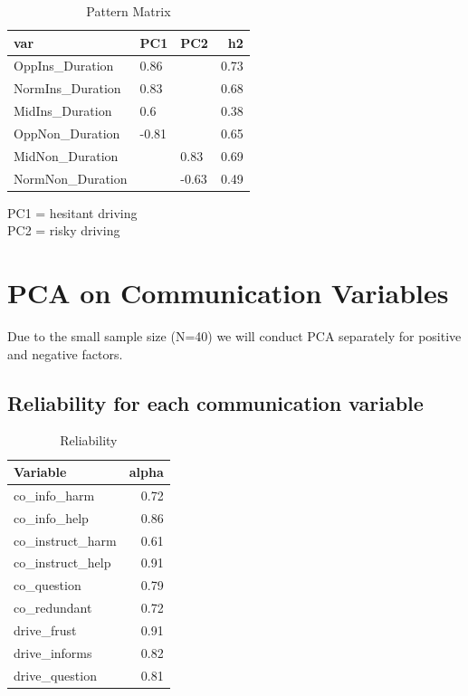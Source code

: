 \documentclass[]{article}
\begin{document}
\begin{table}[H]

\caption{\label{tab:unnamed-chunk-6}Pattern Matrix}
\centering
\fontsize{6}{8}\selectfont
\begin{tabular}[t]{lllr}
\toprule
var & PC1 & PC2 & h2\\
\midrule
OppIns\_Duration & 0.86 &  & 0.73\\
NormIns\_Duration & 0.83 &  & 0.68\\
MidIns\_Duration & 0.6 &  & 0.38\\
OppNon\_Duration & -0.81 &  & 0.65\\
MidNon\_Duration &  & 0.83 & 0.69\\
\addlinespace
NormNon\_Duration &  & -0.63 & 0.49\\
\bottomrule
\end{tabular}
\end{table}

PC1 = hesitant driving\\
PC2 = risky driving

\newpage

\hypertarget{pca-on-communication-variables}{%
\section{PCA on Communication
Variables}\label{pca-on-communication-variables}}

Due to the small sample size (N=40) we will conduct PCA separately for
positive and negative factors.

\hypertarget{reliability-for-each-communication-variable}{%
\subsection{Reliability for each communication
variable}\label{reliability-for-each-communication-variable}}

\begin{table}[H]

\caption{\label{tab:unnamed-chunk-7}Reliability}
\centering
\fontsize{6}{8}\selectfont
\begin{tabular}[t]{lr}
\toprule
Variable & alpha\\
\midrule
co\_info\_harm & 0.72\\
co\_info\_help & 0.86\\
co\_instruct\_harm & 0.61\\
co\_instruct\_help & 0.91\\
co\_question & 0.79\\
\addlinespace
co\_redundant & 0.72\\
drive\_frust & 0.91\\
drive\_informs & 0.82\\
drive\_question & 0.81\\
\bottomrule
\end{tabular}
\end{table}
\end{document}
